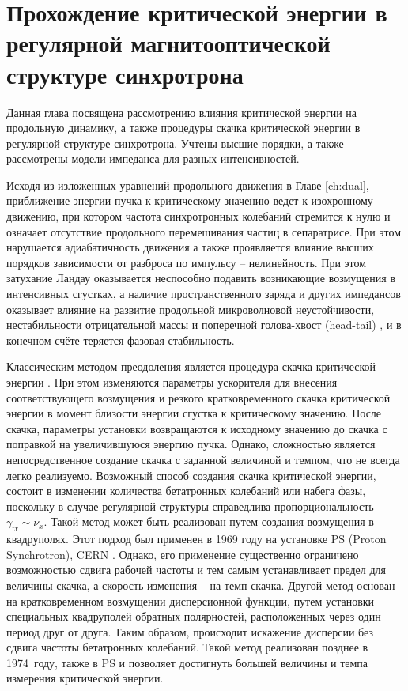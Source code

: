 
	\chapter{Прохождение критической энергии в регулярной магнитооптической структуре синхротрона}\label{ch:transition}

\par Данная глава посвящена рассмотрению влияния критической энергии на продольную динамику, а также процедуры скачка критической энергии в регулярной структуре синхротрона. Учтены высшие порядки, а также рассмотрены модели импеданса для разных интенсивностей.

\par Исходя из изложенных уравнений продольного движения в Главе \ref{ch:dual}, приближение энергии пучка к критическому значению ведет к изохронному движению, при котором частота синхротронных колебаний стремится к нулю и означает отсутствие продольного перемешивания частиц в сепаратрисе. При этом нарушается адиабатичность движения а также проявляется влияние высших порядков зависимости от разброса по импульсу – нелинейность. При этом затухание Ландау оказывается неспособно подавить возникающие возмущения в интенсивных сгустках, а наличие пространственного заряда и других импедансов оказывает влияние на развитие продольной микроволновой неустойчивости, нестабильности отрицательной массы и поперечной голова-хвост (head-tail) \cite{ng}, \cite{MetralMohl} и в конечном счёте теряется фазовая стабильность.

\par	Классическим методом преодоления является процедура скачка критической энергии \cite{risselada:jump}. При этом изменяются параметры ускорителя для внесения соответствующего возмущения и резкого кратковременного скачка критической энергии в момент близости энергии сгустка к критическому значению. После скачка, параметры установки возвращаются к исходному значению до скачка с поправкой на увеличившуюся энергию пучка. Однако, сложностью является непосредственное создание скачка с заданной величиной и темпом, что не всегда легко реализуемо. Возможный способ создания скачка критической энергии, состоит в изменении количества бетатронных колебаний или набега фазы, поскольку в случае регулярной структуры справедлива пропорциональность $\gamma_{\text{tr}} \sim \nu_{x}$. Такой метод может быть реализован путем создания возмущения в квадруполях. Этот подход был применен в 1969 году на установке PS (Proton Synchrotron), CERN \cite{cern:q-jump}. Однако, его применение существенно ограничено возможностью сдвига рабочей частоты и тем самым устанавливает предел для величины скачка, а скорость изменения -- на темп скачка. Другой метод основан на кратковременном возмущении дисперсионной функции, путем установки специальных квадруполей обратных полярностей, расположенных через один период друг от друга.  Таким образом, происходит искажение дисперсии без сдвига частоты бетатронных колебаний. Такой метод реализован позднее в 1974~году, также в PS \cite{cern:new-jump} и позволяет достигнуть большей величины и темпа измерения критической энергии.

